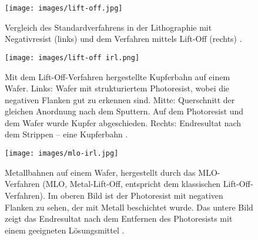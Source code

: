 \documentclass{article} %
\begin{document}
\begin{figure}[htb!]
    \centering
    \texttt{[image: images/lift-off.jpg]} %
    \captionsetup{labelfont=bf, width=\textwidth} %
    \caption{Vergleich des Standardverfahrens in der Lithographie mit Negativresist (links) und dem Verfahren mittels Lift-Off (rechts) \cite{ZeloofWebsite}.}
    \label{fig:lift-off}
\end{figure}

\begin{figure}[htb!]
    \centering
    \texttt{[image: images/lift-off irl.png]} %
    \captionsetup{labelfont=bf, width=\textwidth} %
    \caption{Mit dem Lift-Off-Verfahren hergestellte Kupferbahn auf einem Wafer. Links: Wafer mit strukturiertem Photoresist, wobei die negativen Flanken gut zu erkennen sind. Mitte: Querschnitt der gleichen Anordnung nach dem Sputtern. Auf dem Photoresist und dem Wafer wurde Kupfer abgeschieden. Rechts: Endresultat nach dem Strippen -- eine Kupferbahn \cite{jsr_lift_resists}.}
\label{fig:lift-off irl}
\end{figure}

\begin{figure}[htb!]
    \centering
    \texttt{[image: images/mlo-irl.jpg]} %
    \captionsetup{labelfont=bf, width=.75\textwidth} %
    \caption{Metallbahnen auf einem Wafer, hergestellt durch das MLO-Verfahren (MLO, Metal-Lift-Off, entspricht dem klassischen Lift-Off-Verfahren). Im oberen Bild ist der Photoresist mit negativen Flanken zu sehen, der mit Metall beschichtet wurde. Das untere Bild zeigt das Endresultat nach dem Entfernen des Photoresists mit einem geeigneten Lösungsmittel \cite{ClassOneLiftOff}.}
    \label{fig:mlo-irl}
\end{figure}



 



\end{document}
